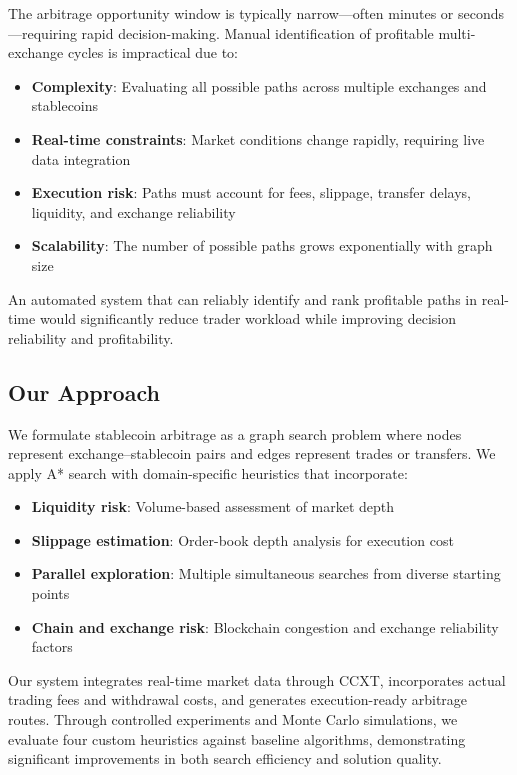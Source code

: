 \documentclass[11pt]{article}
\begin{document}
The arbitrage opportunity window is typically narrow---often minutes or seconds---requiring rapid decision-making. Manual identification of profitable multi-exchange cycles is impractical due to:

\begin{itemize}
\item \textbf{Complexity}: Evaluating all possible paths across multiple exchanges and stablecoins
\item \textbf{Real-time constraints}: Market conditions change rapidly, requiring live data integration
\item \textbf{Execution risk}: Paths must account for fees, slippage, transfer delays, liquidity, and exchange reliability
\item \textbf{Scalability}: The number of possible paths grows exponentially with graph size
\end{itemize}

An automated system that can reliably identify and rank profitable paths in real-time would significantly reduce trader workload while improving decision reliability and profitability.

\subsection{Our Approach}

We formulate stablecoin arbitrage as a graph search problem where nodes represent exchange--stablecoin pairs and edges represent trades or transfers. We apply A* search with domain-specific heuristics that incorporate:

\begin{itemize}
\item \textbf{Liquidity risk}: Volume-based assessment of market depth
\item \textbf{Slippage estimation}: Order-book depth analysis for execution cost
\item \textbf{Parallel exploration}: Multiple simultaneous searches from diverse starting points
\item \textbf{Chain and exchange risk}: Blockchain congestion and exchange reliability factors
\end{itemize}

Our system integrates real-time market data through CCXT, incorporates actual trading fees and withdrawal costs, and generates execution-ready arbitrage routes. Through controlled experiments and Monte Carlo simulations, we evaluate four custom heuristics against baseline algorithms, demonstrating significant improvements in both search efficiency and solution quality.
\end{document}
